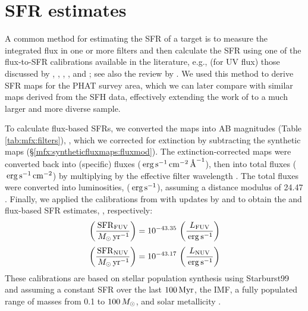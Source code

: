 \section{SFR estimates}\label{mfx:sfrestimates}

A common method for estimating the SFR of a target is to measure the integrated
flux in one or more filters and then calculate the SFR using one of the
flux-to-SFR calibrations available in the literature, e.g., (for UV flux) those
discussed by \citet{Kennicutt:1998}, \citet{Salim:2007}, \citet{Hao:2011},
\citet{Murphy:2011}, and \citet{Leroy:2012}; see also the review by
\citet{Kennicutt:2012}. We used this method to derive SFR maps for the PHAT
survey area, which we can later compare with similar maps derived from the
\citet{Lewis:2014} SFH data, effectively extending the work of
\citet{Simones:2014} to a much larger and more diverse sample.

To calculate flux-based SFRs, we converted the \fxobs{} maps into AB magnitudes
(Table \ref{tab:mfx:filters}), \xobs{}, which we corrected for extinction by
subtracting the synthetic \ax{} maps (\S \ref{mfx:syntheticfluxmaps:fluxmod}).
The extinction-corrected maps were converted back into (specific) fluxes ($\,\mathrm{erg}
\,\mathrm{s}^{-1} \,\mathrm{cm}^{-2} \,\textrm{\AA}^{-1}$), then into total fluxes ($\,\mathrm{erg} \,\mathrm{s}^{-1}
\,\mathrm{cm}^{-2}$) by multiplying by the effective filter wavelength
\citep[$1538.6\ang$ for \fuv{}, $2315.7\ang$ for \nuv{};][]{Morrissey:2007}.
The total fluxes were converted into luminosities, \lx{} ($\,\mathrm{erg} \,\mathrm{s}^{-1}$),
assuming a distance modulus of 24.47 \citep{McConnachie:2005}. Finally, we
applied the calibrations from \citet{Kennicutt:1998} with updates by
\citet{Hao:2011} and \citet{Murphy:2011} \citep[see the review
by][]{Kennicutt:2012} to obtain the \fuv{} and \nuv{} flux-based SFR estimates,
\sfrx{}, respectively:
\begin{equation}
\left(\frac{\mathrm{SFR}_{\mathrm{FUV}}}{\,M_\odot\,\mathrm{yr}^{-1}}\right) =
    10^{-43.35}\,\left(\frac{L_{\mathrm{FUV}}}{\,\mathrm{erg}\,\mathrm{s}^{-1}}\right)
\end{equation}\label{mfx:eq:fuvcal}
\begin{equation}
\left(\frac{\mathrm{SFR}_{\mathrm{NUV}}}{\,M_\odot\,\mathrm{yr}^{-1}}\right) =
    10^{-43.17}\,\left(\frac{L_{\mathrm{NUV}}}{\,\mathrm{erg}\,\mathrm{s}^{-1}}\right)
\end{equation}\label{mfx:eq:nuvcal}
These calibrations are based on stellar population synthesis using Starburst99
\citep{Leitherer:1999} and assuming a constant SFR over the last $100\,\mathrm{Myr}$, the
\citet{Kroupa:2001} IMF, a fully populated range of masses from 0.1 to
$100\,M_\odot$, and solar metallicity \citep{Hao:2011}.

